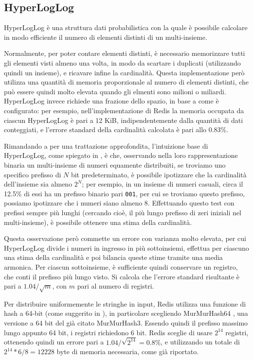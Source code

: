 \subsection{HyperLogLog}

HyperLogLog \cite{hyperloglog} è una struttura dati probabilistica con la quale è possibile
calcolare in modo efficiente il numero di elementi distinti di un multi-insieme. 

Normalmente, per poter contare elementi distinti, è necessario memorizzare tutti gli elementi visti
almeno una volta, in modo da scartare i duplicati (utilizzando quindi un insieme), e ricavare infine
la cardinalità. Questa implementazione però utilizza una quantità di memoria proporzionale al numero
di elementi distinti, che può essere quindi molto elevata quando gli elmenti sono milioni o
miliardi. HyperLogLog invece richiede una frazione dello spazio, in base a come è configurato: per
esempio, nell'implementazione di Redis la memoria occupata da ciascun HyperLogLog è pari a 12 KiB,
indipendentemente dalla quantità di dati conteggiati, e l'errore standard della cardinalità
calcolata è pari allo 0.83\%.

Rimandando a \cite{hyperloglog} per una trattazione approfondita, l'intuizione base di HyperLogLog,
come spiegato in \cite{hyperloglog-explain}, è che, osservando nella loro
rappresentazione binaria un multi-insieme di numeri equamente distribuiti, se troviamo uno specifico
prefisso di $N$ bit predeterminato, è possibile ipotizzare che la cardinalità dell'insieme sia
almeno $2^N$; per esempio, in un insieme di numeri casuali, circa il 12.5\% di essi ha un prefisso
binario pari \verb|001|, per cui se troviamo questo prefisso, possiamo ipotizzare che i numeri siano
almeno 8. Effettuando questo test con prefissi sempre più lunghi (cercando cioè, il più lungo
prefisso di zeri iniziali nel multi-insieme), è possibile ottenere una stima della cardinalità.

Questa osservazione però commette un errore con varianza molto elevata, per cui HyperLogLog divide i
numeri in ingresso in più sottoinsiemi, effettua per ciascuno una stima della cardinalità e poi
bilancia queste stime tramite una media armonica. Per ciascun sottoinsieme, è sufficiente quindi
conservare un registro, che conti il prefisso più lungo visto. Si calcola che l'errore standard 
risultante è pari a $1.04 / \sqrt{m}$, con $m$ pari al numero di registri. 

Per distribuire uniformemente le stringhe in input, Redis utilizza una funzione di hash a 64-bit
(come suggerito in \cite{hyperloglog-plusplus}), in particolare scegliendo MurMurHash64
\cite{murmur}, una versione a 64 bit del già citato MurMurHash3.
Essendo quindi il prefisso massimo lungo appunto 64 bit, i registri richiedono 6 bit. Redis sceglie
di usare $2^{14}$ registri, ottenendo quindi un errore pari a $1.04 / \sqrt{2^{14}} = 0.8\%$, e
utilizzando un totale di $2^{14} * 6 / 8 = 12228$ byte di memoria necessaria, come già riportato.

